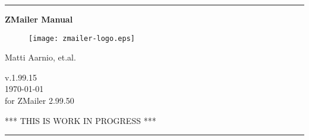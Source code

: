 \documentclass[twoside,twocolumn,a4paper,draft]{book}
\newcommand{\ZMailerManual}{ZMailer Manual}
\newcommand{\ZManVersion}{v.1.99.15}
\begin{document}
\startdocument

\begin{titlepage}
\rule{\textwidth}{1mm}
\begin{center}
\bf
\Huge
\vspace{2ex}
\ZMailerManual \\
\vspace{2ex}

\begin{htmlonly}
\end{htmlonly}

\begin{figure}[h]
  \texttt{[image: zmailer-logo.eps]}
\end{figure}
\vspace{2ex}

\Large
Matti Aarnio, et.al. \\
\vspace{2ex}
\begin{htmlonly}
\vspace{1ex}
\end{htmlonly}
\ZManVersion \\
{\today{}} \\
for ZMailer 2.99.50 \\
\vspace{2ex}
\begin{htmlonly}
\vspace{1ex}
\end{htmlonly}
\Large
\sf
*** THIS IS WORK IN PROGRESS ***
\end{center}
\vfill
\rule{\textwidth}{1mm}
\end{titlepage}

\cleardoublepage


%
\end{document}
